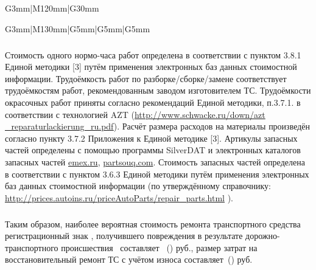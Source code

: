 \begin{longtable}{G{3mm}|M{120mm}|G{30mm}}
\begin{longtable}{G{3mm}|M{130mm}|G{5mm}|G{5mm}|G{5mm}}
%
%
%
\subparagraph{}Стоимость одного нормо-часа работ определена в соответствии с пунктом 3.8.1 Единой методики [3] путём применения электронных баз данных стоимостной информации.
Трудоёмкость работ по разборке/сборке/замене  соответствует трудоёмкостям работ, рекомендованным заводом изготовителем ТС. Трудоёмкости окрасочных работ приняты согласно рекомендаций Единой методики, п.3.7.1. в соответствии с технологией  AZT (\url{http://www.schwacke.ru/down/azt _reparaturlackierung_ru.pdf}). Расчёт размера расходов на материалы произведён  согласно пункту 3.7.2 Приложения к Единой методике [3]. Артикулы запасных частей определены с помощью программы SilverDAT и электронных  каталогов запасных частей \url{emex.ru}, \url{partsouq.com}.
Стоимость запасных частей определена в соответствии с пунктом 3.6.3 Единой методики путём применения электронных баз данных стоимостной информации (по утверждённому справочнику: \url{http://prices.autoins.ru/priceAutoParts/repair_parts.html} ).
% 
\subparagraph{}Таким образом,  наиболее вероятная стоимость ремонта транспортного средства \tc\, регистрационный знак , получившего повреждения в результате дорожно-транспортного происшествия  \, составляет  \, (\!\!) руб.,  размер затрат на восстановительный ремонт ТС с учётом износа составляет  \,(\!\!) руб.
%      
%
%


%
%
%
%    
%    
%    

\end{longtable}
\end{longtable}
